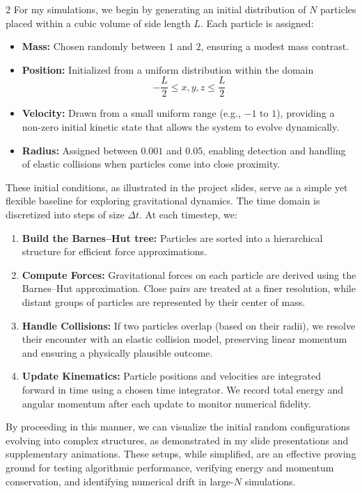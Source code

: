 \documentclass[a4paper, 12pt, oneside, onecolumn]{article}
\begin{document}
\begin{multicols}{2}
For my simulations, we begin by generating an initial distribution of $N$ particles placed within a cubic volume of side length $L$. Each particle is assigned:

\begin{itemize}
    \item \textbf{Mass:} Chosen randomly between $1$ and $2$, ensuring a modest mass contrast.
    \item \textbf{Position:} Initialized from a uniform distribution within the domain $$-\frac{L}{2}  \leq x, y, z \leq \frac{L}{2} $$
    \item \textbf{Velocity:} Drawn from a small uniform range (e.g., $-1$ to $1$), providing a non-zero initial kinetic state that allows the system to evolve dynamically.
    \item \textbf{Radius:} Assigned between $0.001$ and $0.05$, enabling detection and handling of elastic collisions when particles come into close proximity.
\end{itemize}

These initial conditions, as illustrated in the project slides, serve as a simple yet flexible baseline for exploring gravitational dynamics. The time domain is discretized into steps of size $\Delta t$. At each timestep, we:

\begin{enumerate}
    \item \textbf{Build the Barnes--Hut tree:} Particles are sorted into a hierarchical structure for efficient force approximations.
    \item \textbf{Compute Forces:} Gravitational forces on each particle are derived using the Barnes--Hut approximation. Close pairs are treated at a finer resolution, while distant groups of particles are represented by their center of mass.
    \item \textbf{Handle Collisions:} If two particles overlap (based on their radii), we resolve their encounter with an elastic collision model, preserving linear momentum and ensuring a physically plausible outcome.
    \item \textbf{Update Kinematics:} Particle positions and velocities are integrated forward in time using a chosen time integrator. We record total energy and angular momentum after each update to monitor numerical fidelity.
\end{enumerate}

By proceeding in this manner, we can visualize the initial random configurations evolving into complex structures, as demonstrated in my slide presentations and supplementary animations. These setups, while simplified, are an effective proving ground for testing algorithmic performance, verifying energy and momentum conservation, and identifying numerical drift in large-$N$ simulations.


\end{multicols}
\end{document}
